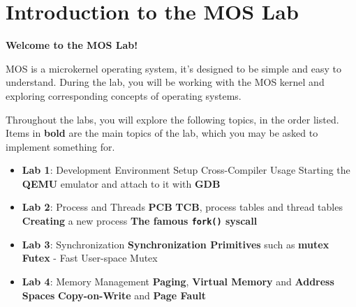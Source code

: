 \chapter*{Introduction to the MOS Lab}

\textbf{Welcome to the MOS Lab!}

MOS is a microkernel operating system, it's designed to be simple and easy to understand.
During the lab, you will be working with the MOS kernel and exploring corresponding concepts of
operating systems.

Throughout the labs, you will explore the following topics, in the order listed. Items in
\textbf{bold} are the main topics of the lab, which you may be asked to implement something for.

\begin{itemize}
    \item \textbf{Lab 1}: Development Environment Setup
          \subitem Cross-Compiler Usage
          \subitem Starting the \textbf{QEMU} emulator and attach to it with \textbf{GDB}
    \item \textbf{Lab 2}: Process and Threads
          \subitem \textbf{PCB} \textbf{TCB}, process tables and thread tables
          \subitem \textbf{Creating} a new process
          \subitem \textbf{The famous \texttt{fork()} syscall}
    \item \textbf{Lab 3}: Synchronization
          \subitem \textbf{Synchronization Primitives} such as \textbf{mutex}
          \subitem \textbf{Futex} - Fast User-space Mutex
    \item \textbf{Lab 4}: Memory Management
          \subitem \textbf{Paging}, \textbf{Virtual Memory} and \textbf{Address Spaces}
          \subitem \textbf{Copy-on-Write} and \textbf{Page Fault}
\end{itemize}
